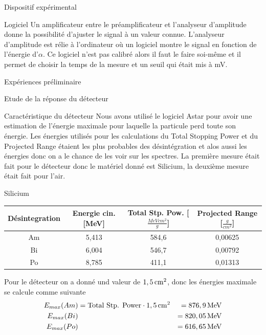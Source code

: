 \documentclass[a4paper,11pt,liststotocnumbered,bibtotocnumbered]{scrartcl}
\begin{document}
\begin{section}{Dispositif expérimental}
  \begin{subsection}{Logiciel}
   Un amplificateur entre le préamplificateur et l'analyseur d'amplitude donne la possibilité d'ajuster le signal à un valeur connue. L'analyseur d'amplitude est rélie à l'ordinateur où un logiciel montre le signal en fonction de l'énergie d'$\alpha$. Ce logiciel n'est pas calibré alors il faut le faire soi-même et il permet de choisir la temps de la mesure et un seuil qui était mis à \unit[200]{mV}.
  \end{subsection}
 \end{section}
  
 \begin{section}{Expériences préliminaire}
  \begin{subsection}{Etude de la réponse du détecteur}
   \begin{subsubsection}{Caractéristique du détecteur}
   Nous avons utilisé le logiciel \flqq Astar \frqq \cite{astar} pour avoir une estimation de l'énergie maximale pour laquelle la particule perd toute son énergie.  Les énergies utilisés pour les calculations du Total Stopping Power et du Projected Range étaient les plus probables des désintégration et alos aussi les énergies donc on a le chance de les voir sur les spectres. La première mesure était fait pour le détecteur donc le matériel donné est Silicium, la deuxième mesure était fait pour l'air.
   \begin{paragraph}{Silicium}
    \begin{center}
     \begin{tabular}{c|c|c|c}
      Désintegration&	Energie cin. [MeV] & Total Stp. Pow. [$\frac{MeV cm^2}{g}$]  & Projected Range [$\frac{g}{cm^2}$] \\ \hline
      Am 	&5,413 & 584,6 & 0,00625 \\ 
      Bi	&6,004 & 546,7 & 0,00792 \\ 
      Po	&8,785 & 411,1 & 0,01313 \\ 
     \end{tabular}
    \end{center}
    Pour le détecteur on a donné und valeur de $\unit[1,5]{cm^2}$, donc les énergies maximale se calcule comme suivante 
    \begin{eqnarray*}
     E_{max}(Am)&=\text{Total Stp. Power}\cdot \unit[1,5]{cm^2}&=\unit[876,9]{MeV}\\
     E_{max}(Bi)&&=\unit[820,05]{MeV}\\
     E_{max}(Po)&&=\unit[616,65]{MeV}
    \end{eqnarray*}

\end{paragraph}
\end{subsubsection}
\end{subsection}
\end{section}
\end{document}
